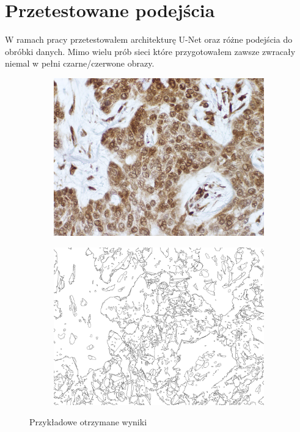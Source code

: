 \documentclass{article}
\begin{document}
\section{Przetestowane podejścia}
W ramach pracy przetestowałem architekturę U-Net oraz różne podejścia do obróbki danych.
Mimo wielu prób sieci które przygotowałem zawsze zwracały niemal w pełni czarne/czerwone obrazy.
\begin{figure}[H]
  \centering
  \begin{subfigure}{0.4\linewidth}
    \includegraphics[width=\linewidth]{images/input.png}
  \end{subfigure}
  \begin{subfigure}{0.4\linewidth}
    \includegraphics[width=\linewidth]{images/output.jpg}
  \end{subfigure}
  \caption{Przykładowe otrzymane wyniki}
  \label{fig:input_and_output}
\end{figure}
\end{document}

